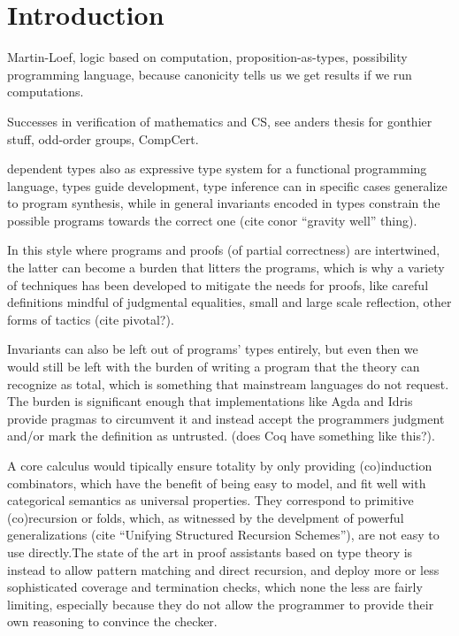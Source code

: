 \documentclass{book}
\begin{document}
\chapter{Introduction}
Martin-Loef, logic based on computation, proposition-as-types,
possibility programming language, because canonicity tells us we get results
if we run computations.

  Successes in verification of mathematics and CS, see anders thesis for gonthier stuff, odd-order groups, CompCert.

  dependent types also as expressive type system for a functional
  programming language, types guide development, type inference can in
  specific cases generalize to program synthesis, while in general
  invariants encoded in types constrain the possible programs towards
  the correct one (cite conor ``gravity well'' thing).
  
  In this style where programs and proofs (of partial correctness) are
  intertwined, the latter can become a burden that litters the
  programs, which is why a variety of techniques has been developed to
  mitigate the needs for proofs, like careful definitions mindful of judgmental equalities, small and
  large scale reflection, other forms of tactics (cite pivotal?).
    
  Invariants can also be left out of programs' types entirely, but
  even then we would still be left with the burden of writing a
  program that the theory can recognize as total, which is something
  that mainstream languages do not request. The burden is significant
  enough that implementations like Agda and Idris provide pragmas to
  circumvent it and instead accept the programmers judgment and/or
  mark the definition as untrusted. (does Coq have something like this?).

  A core calculus would tipically ensure totality by only providing
  (co)induction combinators, which have the benefit of being easy to
  model, and fit well with categorical semantics as universal
  properties.  They correspond to primitive (co)recursion or folds,
  which, as witnessed by the develpment of powerful generalizations
  (cite ``Unifying Structured Recursion Schemes''), are not easy to
  use directly.The state of the art in proof assistants based on type
  theory is instead to allow pattern matching and direct recursion,
  and deploy more or less sophisticated coverage and termination
  checks, which none the less are fairly limiting, especially because
  they do not allow the programmer to provide their own reasoning to
  convince the checker.
  
\end{document}
